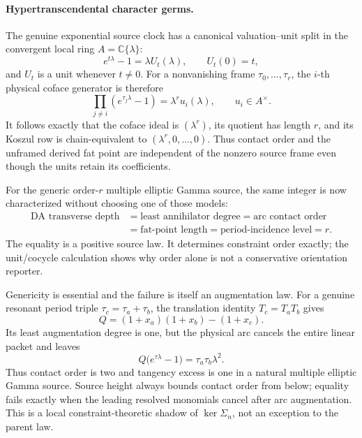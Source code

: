 \documentclass[11pt]{article}
\theoremstyle{definition}
\theoremstyle{remark}
\newcommand{\C}{\mathbb C}
\begin{document}
\paragraph{Hypertranscendental character germs.}
The genuine exponential source clock has a canonical valuation--unit split
in the convergent local ring \(A=\C\{\lambda\}\):
\[
 e^{t\lambda}-1=\lambda U_t(\lambda),
 \qquad U_t(0)=t,
\tag{3.7d}\label{eq:clock-unit-split}
\]
and \(U_t\) is a unit whenever \(t\ne0\).  For a nonvanishing frame
\(\tau_0,\ldots,\tau_r\), the \(i\)-th physical coface generator is
therefore
\[
 \prod_{j\ne i}(e^{\tau_j\lambda}-1)
   =\lambda^r u_i(\lambda),
 \qquad u_i\in A^\times.
\tag{3.7e}\label{eq:coface-unit-row}
\]
It follows exactly that the coface ideal is \((\lambda^r)\), its quotient
has length \(r\), and its Koszul row is chain-equivalent to
\((\lambda^r,0,\ldots,0)\).  Thus contact order and the unframed derived
fat point are independent of the nonzero source frame even though the
units retain its coefficients.

For the generic order-\(r\) multiple elliptic Gamma source, the same
integer is now characterized without choosing one of those models:
\[
\begin{aligned}
 \text{DA transverse depth}
 &=\text{least annihilator degree}
  =\text{arc contact order}\\
 &=\text{fat-point length}
  =\text{period-incidence level}=r.
\end{aligned}
\tag{3.7g}\label{eq:multiple-gamma-order-law}
\]
The equality is a positive source law.  It determines constraint order
exactly; the unit/cocycle calculation shows why order alone is not a
conservative orientation reporter.

Genericity is essential and the failure is itself an augmentation law.
For a genuine resonant period triple
\(\tau_c=\tau_a+\tau_b\), the translation identity
\(T_c=T_aT_b\) gives
\[
 Q=(1+x_a)(1+x_b)-(1+x_c).
\tag{3.7h}\label{eq:resonant-operator}
\]
Its least augmentation degree is one, but the physical arc cancels the
entire linear packet and leaves
\[
              Q\bigl(e^{\tau\lambda}-1\bigr)
                 =\tau_a\tau_b\lambda^2.
\tag{3.7i}\label{eq:resonant-tangency}
\]
Thus contact order is two and tangency excess is one in a natural multiple
elliptic Gamma source.  Source height always bounds contact order from
below; equality fails exactly when the leading resolved monomials cancel
after arc augmentation.  This is a local constraint-theoretic shadow of
\(\ker\Sigma_n\), not an exception to the parent law.
\end{document}
